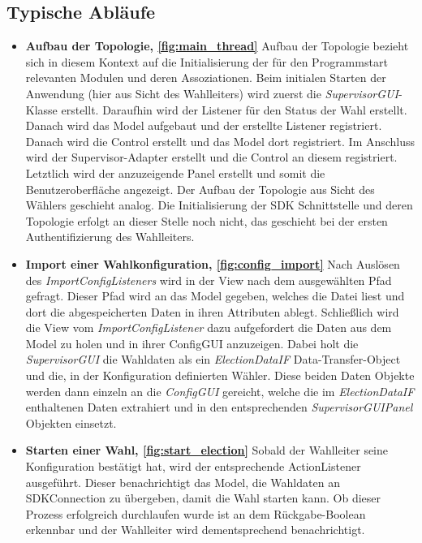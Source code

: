 \documentclass[parskip=full]{scrartcl}
\newcommand{\fakeparagraph}[1]{\textbf{#1}}
\begin{document}
\subsection{Typische Abläufe}
	\begin{itemize}
	\item\fakeparagraph{Aufbau der Topologie, \autoref{fig:main_thread}} Aufbau der Topologie bezieht sich in diesem Kontext auf die Initialisierung der für den Programmstart relevanten Modulen und deren Assoziationen. Beim initialen Starten der Anwendung (hier aus Sicht des Wahlleiters) wird zuerst die \textit{SupervisorGUI}-Klasse erstellt. Daraufhin wird der Listener für den Status der Wahl erstellt. Danach wird das Model aufgebaut und der erstellte Listener registriert. Danach wird die Control erstellt und das Model dort registriert. Im Anschluss wird der Supervisor-Adapter erstellt und die Control an diesem registriert. Letztlich wird der anzuzeigende Panel erstellt und somit die Benutzeroberfläche angezeigt.
	Der Aufbau der Topologie aus Sicht des Wählers geschieht analog.
	Die Initialisierung der SDK Schnittstelle und deren Topologie erfolgt an dieser Stelle noch nicht, das geschieht bei der ersten Authentifizierung des Wahlleiters.
	
	\item\fakeparagraph{Import einer Wahlkonfiguration, \autoref{fig:config_import}} Nach Auslösen des \textit{ImportConfigListeners} wird in der View nach dem ausgewählten Pfad gefragt. Dieser Pfad wird an das Model gegeben, welches die Datei liest und dort die abgespeicherten Daten in ihren Attributen ablegt.
	Schließlich wird die View vom \textit{ImportConfigListener} dazu aufgefordert die Daten aus dem Model zu holen und in ihrer ConfigGUI anzuzeigen.
	Dabei holt die \textit{SupervisorGUI} die Wahldaten als ein \textit{ElectionDataIF} Data-Transfer-Object und die, in der Konfiguration definierten Wähler. Diese beiden Daten Objekte werden dann einzeln an die \textit{ConfigGUI} gereicht, welche die im \textit{ElectionDataIF} enthaltenen Daten extrahiert und in den entsprechenden \textit{SupervisorGUIPanel} Objekten einsetzt.

	\item\fakeparagraph{Starten einer Wahl, \autoref{fig:start_election}} Sobald der Wahlleiter seine Konfiguration bestätigt hat, wird der entsprechende ActionListener ausgeführt. Dieser benachrichtigt das Model, die Wahldaten an SDKConnection zu übergeben, damit die Wahl starten kann. Ob dieser Prozess erfolgreich durchlaufen wurde ist an dem Rückgabe-Boolean erkennbar und der Wahlleiter wird dementsprechend benachrichtigt.
	

\end{itemize}
\end{document}
